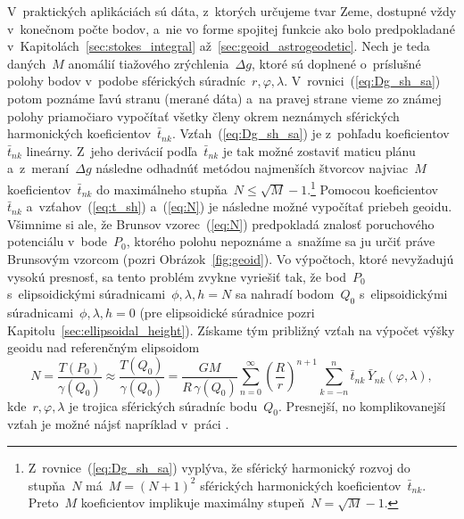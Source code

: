 \documentclass[a4paper, 12pt]{book}
\begin{document}
V~praktických aplikáciách sú dáta, z~ktorých určujeme tvar Zeme, dostupné vždy 
v~konečnom počte bodov, a~nie vo forme spojitej funkcie ako bolo predpokladané 
v~Kapitolách~\ref{sec:stokes_integral} až~\ref{sec:geoid_astrogeodetic}.  Nech 
je teda daných~$M$ anomálií tiažového zrýchlenia~$\Delta g$, ktoré sú doplnené 
o~príslušné polohy bodov v~podobe sférických súradníc~$r, \varphi, \lambda$.  
V~rovnici~(\ref{eq:Dg_sh_sa}) potom poznáme ľavú stranu (merané dáta) a~na 
pravej strane vieme zo známej polohy priamočiaro vypočítať všetky členy okrem 
neznámych sférických harmonických koeficientov~$\bar{t}_{nk}$.  
Vzťah~(\ref{eq:Dg_sh_sa}) je z~pohľadu koeficientov~$\bar{t}_{nk}$ lineárny.  
Z~jeho derivácií podľa~$\bar{t}_{nk}$ je tak možné zostaviť maticu plánu 
a~z~meraní~$\Delta g$ následne odhadnúť metódou najmenších štvorcov najviac~$M$ 
koeficientov~$\bar{t}_{nk}$ do maximálneho stupňa~$N \leq \sqrt{M} 
- 1$.\footnote{Z~rovnice~(\ref{eq:Dg_sh_sa}) vyplýva, že sférický harmonický 
rozvoj do stupňa~$N$ má~$M = (N + 1)^2$ sférických harmonických 
koeficientov~$\bar{t}_{nk}$.  Preto~$M$ koeficientov implikuje maximálny 
stupeň~$N = \sqrt{M} - 1$.}  Pomocou koeficientov~$\bar{t}_{nk}$ 
a~vzťahov~(\ref{eq:t_sh}) a~(\ref{eq:N}) je následne možné vypočítať priebeh 
geoidu.  Všimnime si ale, že Brunsov vzorec~(\ref{eq:N}) predpokladá znalosť 
poruchového potenciálu v~bode~$P_0$, ktorého polohu nepoznáme a~snažíme sa ju 
určiť práve Brunsovým vzorcom (pozri Obrázok~\ref{fig:geoid}). Vo výpočtoch, 
ktoré nevyžadujú vysokú presnosť, sa tento problém zvykne vyriešiť tak, že 
bod~$P_0$ s~elipsoidickými súradnicami~$\phi, \lambda, h = N$ sa nahradí 
bodom~$Q_0$ s~elipsoidickými súradnicami~$\phi, \lambda, h = 0$ (pre 
elipsoidické súradnice pozri Kapitolu~\ref{sec:ellipsoidal_height}).  Získame 
tým približný vzťah na výpočet výšky geoidu nad referenčným elipsoidom
%
\begin{equation}
\label{eq:geoid_sh}
N = \frac{T(P_0)}{\gamma(Q_0)} \approx \frac{T(Q_0)}{\gamma(Q_0)} = \frac{GM}{R 
\, \gamma(Q_0)} \sum_{n = 0}^\infty \left( \frac{R}{r} \right)^{n
+ 1} \sum_{k = -n}^{n} \bar{t}_{nk} \, \bar{Y}_{nk}(\varphi, \lambda){,}
\end{equation}
%
kde~$r, \varphi, \lambda$ je trojica sférických súradníc bodu~$Q_0$.  
Presnejší, no komplikovanejší vzťah je možné nájsť napríklad v~práci 
\textcite{Barthelmes2013}.
\end{document}
